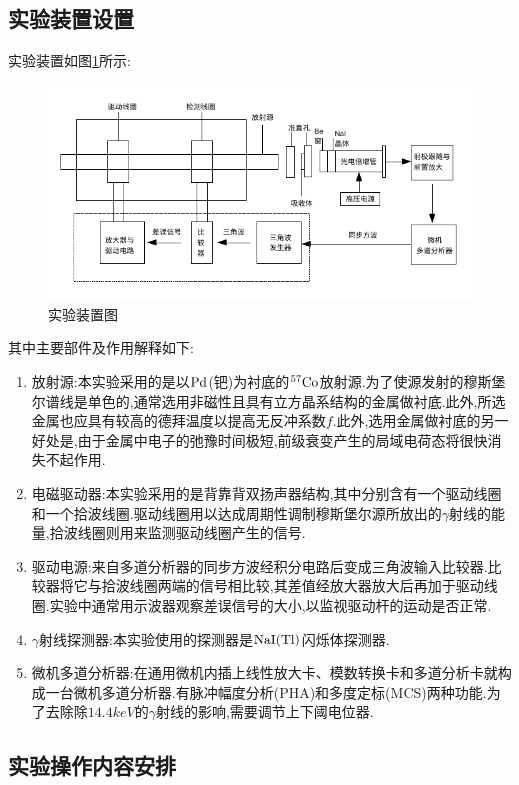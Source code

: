 \documentclass[aps,pre,12pt,preprint,onecolumn,showpacs,showkeys]{revtex4-1}
\begin{document}
\subsection{实验装置设置}
实验装置如图\ref{fig:1}所示:
\begin{figure}[htbp]
    \centering
    \includegraphics[width=\textwidth]{device.jpg}
    \caption{实验装置图}
    \label{fig:1}
\end{figure}
其中主要部件及作用解释如下:
\begin{enumerate}
    \item 放射源:本实验采用的是以$\rm{Pd}$(钯)为衬底的$^{57}\rm{Co}$放射源.为了使源发射的穆斯堡尔谱线是单色的,通常选用非磁性且具有立方晶系结构的金属做衬底.此外,所选金属也应具有较高的德拜温度以提高无反冲系数$f$.此外,选用金属做衬底的另一好处是,由于金属中电子的弛豫时间极短,前级衰变产生的局域电荷态将很快消失不起作用.
    \item 电磁驱动器:本实验采用的是背靠背双扬声器结构,其中分别含有一个驱动线圈和一个拾波线圈.驱动线圈用以达成周期性调制穆斯堡尔源所放出的$\gamma$射线的能量,拾波线圈则用来监测驱动线圈产生的信号.
    \item 驱动电源:来自多道分析器的同步方波经积分电路后变成三角波输入比较器.比较器将它与拾波线圈两端的信号相比较,其差值经放大器放大后再加于驱动线圈.实验中通常用示波器观察差误信号的大小,以监视驱动杆的运动是否正常.
    \item $\gamma$射线探测器:本实验使用的探测器是$\rm{NaI(Tl)}$闪烁体探测器.
    \item 微机多道分析器:在通用微机内插上线性放大卡、模数转换卡和多道分析卡就构成一台微机多道分析器.有脉冲幅度分析(PHA)和多度定标(MCS)两种功能.为了去除除$\si{14.4 keV}$的$\gamma$射线的影响,需要调节上下阈电位器.

\end{enumerate}
\subsection{实验操作内容安排}
\end{document}
